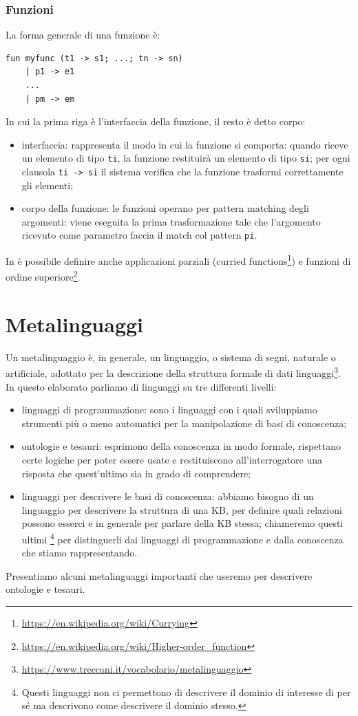 \subsubsection{Funzioni}
La forma generale di una funzione è:
\begin{verbatim}
fun myfunc (t1 -> s1; ...; tn -> sn)
	| p1 -> e1
	...
	| pm -> em
\end{verbatim}
In cui la prima riga è l'interfaccia della funzione, il resto è detto corpo:
\begin{itemize}
	\item interfaccia: rappresenta il modo in cui la funzione si comporta: quando riceve un elemento di tipo \verb|ti|, la funzione restituirà un elemento di tipo \verb|si|; per ogni clausola \verb|ti -> si| il sistema verifica che la funzione trasformi correttamente gli elementi;
	\item corpo della funzione: le funzioni operano per pattern matching degli argomenti: viene eseguita la prima trasformazione tale che l'argomento ricevuto come parametro faccia il match col pattern \verb|pi|. 
\end{itemize}
In \cduce è possibile definire anche applicazioni parziali (curried functions\footnote{\url{https://en.wikipedia.org/wiki/Currying}}) e funzioni di ordine superiore\footnote{\url{https://en.wikipedia.org/wiki/Higher-order\_function}}.
\section{Metalinguaggi}
Un metalinguaggio è, in generale, un linguaggio, o sistema di segni, naturale o artificiale, adottato per la descrizione della struttura formale di dati linguaggi\footnote{\url{https://www.treccani.it/vocabolario/metalinguaggio}}. In questo elaborato parliamo di linguaggi su tre differenti livelli:
\begin{itemize}
	\item linguaggi di programmazione: sono i linguaggi con i quali sviluppiamo strumenti più o meno automatici per la manipolazione di basi di conoscenza;
	\item ontologie e tesauri: esprimono della conoscenza in modo formale, rispettano certe logiche per poter essere usate e restituiscono all'interrogatore una risposta che quest'ultimo sia in grado di comprendere;
	\item linguaggi per descrivere le basi di conoscenza: abbiamo bisogno di un linguaggio per descrivere la struttura di una KB, per definire quali relazioni possono esserci e in generale per parlare della KB stessa; chiameremo questi ultimi \footnote{Questi linguaggi non ci permettono di descrivere il dominio di interesse di per sé ma descrivono come descrivere il dominio stesso.} per distinguerli dai linguaggi di programmazione e dalla conoscenza che stiamo rappresentando.
\end{itemize}
Presentiamo alcuni metalinguaggi importanti che useremo per descrivere ontologie e tesauri.
